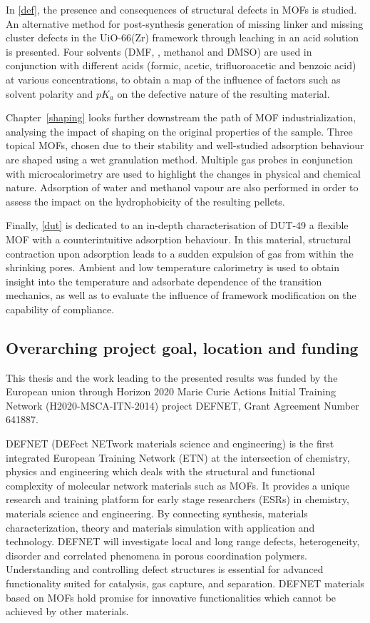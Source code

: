 In \autoref{def}, the presence and consequences of structural defects
in \glspl{MOF} is studied. An alternative method for post-synthesis generation
of missing linker and missing cluster defects in the 
UiO-66(Zr) framework through leaching in an acid solution is presented.
Four solvents (\gls{DMF}, , methanol and \gls{DMSO}) are used in 
conjunction with different acids (formic, acetic, trifluoroacetic and
benzoic acid) at various concentrations, to obtain a map of 
the influence of factors such as solvent polarity and \(pK_a\)
on the defective nature of the resulting material.

Chapter~\ref{shaping} looks further downstream the path of 
\gls{MOF} industrialization, analysing the impact of shaping on the
original properties of the sample. Three topical \glspl{MOF}, chosen
due to their stability and well-studied adsorption behaviour
are shaped using a wet granulation method. Multiple gas probes 
in conjunction with microcalorimetry are used to highlight the 
changes in physical and chemical nature. Adsorption of water and 
methanol vapour are also performed in order to assess the impact on 
the hydrophobicity of the resulting pellets.

Finally, \autoref{dut} is dedicated to an in-depth characterisation
of DUT-49 a flexible \gls{MOF} with a counterintuitive adsorption behaviour.
In this material, structural contraction upon adsorption leads 
to a sudden expulsion of gas from within the shrinking pores.
Ambient and low temperature calorimetry is used to obtain 
insight into the temperature and adsorbate dependence of 
the transition mechanics, as well as to evaluate
the influence of framework modification on the capability of 
compliance.

\subsection*{Overarching project goal, location and funding}

This thesis and the work leading to the presented results 
was funded by the European union through Horizon 2020 Marie Curie
Actions Initial Training Network (H2020-MSCA-ITN-2014)
project DEFNET, Grant Agreement Number 641887.

DEFNET (DEFect NETwork materials science and engineering) is
the first integrated European Training Network (ETN) at the intersection
of chemistry, physics and engineering which deals with the structural and
functional complexity of molecular network materials such as \glspl{MOF}. 
It provides a unique research and training platform for
early stage researchers (ESRs) in chemistry, materials science and engineering.
By connecting synthesis, materials characterization, theory and materials simulation
with application and technology. DEFNET will investigate local and long
range defects, heterogeneity, disorder and correlated phenomena in
porous coordination polymers.
Understanding and controlling defect structures is essential for advanced
functionality suited for catalysis, gas capture, and separation. DEFNET
materials based on \glspl{MOF} hold promise for innovative functionalities which
cannot be achieved by other materials.

